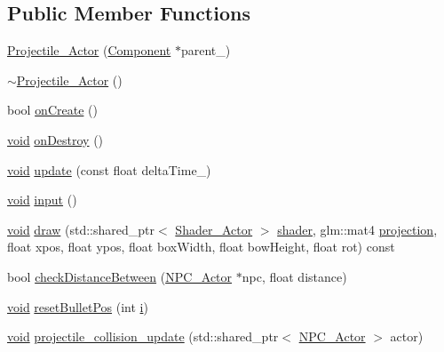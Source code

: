 \subsection*{Public Member Functions}
\begin{DoxyCompactItemize}
\item 
\hyperlink{classProjectile__Actor_a2cae6df0c47bae8d6162855c310be1df}{Projectile\+\_\+\+Actor} (\hyperlink{classComponent}{Component} $\ast$parent\+\_\+)
\item 
\hyperlink{classProjectile__Actor_a0813f8233d0b8df5e9ac8cf47b12b5a8}{$\sim$\+Projectile\+\_\+\+Actor} ()
\item 
bool \hyperlink{classProjectile__Actor_a98e2e2198cd164c35318c04f96e6a3ac}{on\+Create} ()
\item 
\hyperlink{imgui__impl__opengl3__loader_8h_ac668e7cffd9e2e9cfee428b9b2f34fa7}{void} \hyperlink{classProjectile__Actor_a58d01ff77f0815ca611236f139b7aafa}{on\+Destroy} ()
\item 
\hyperlink{imgui__impl__opengl3__loader_8h_ac668e7cffd9e2e9cfee428b9b2f34fa7}{void} \hyperlink{classProjectile__Actor_ab61aec7117a93626c3096bef71ab30fc}{update} (const float delta\+Time\+\_\+)
\item 
\hyperlink{imgui__impl__opengl3__loader_8h_ac668e7cffd9e2e9cfee428b9b2f34fa7}{void} \hyperlink{classProjectile__Actor_a63aab28b99512041ebbd7474c8acb1b4}{input} ()
\item 
\hyperlink{imgui__impl__opengl3__loader_8h_ac668e7cffd9e2e9cfee428b9b2f34fa7}{void} \hyperlink{classProjectile__Actor_ab2cbe2e37cc22542c5a4446e33075300}{draw} (std\+::shared\+\_\+ptr$<$ \hyperlink{classShader__Actor}{Shader\+\_\+\+Actor} $>$ \hyperlink{imgui__impl__opengl3__loader_8h_a57b2a96adb1d51204909a82d861e395e}{shader}, glm\+::mat4 \hyperlink{main__menu__state_8cpp_a565d92bfbcc4a481d2d35f3850a382f7}{projection}, float xpos, float ypos, float box\+Width, float bow\+Height, float rot) const
\item 
bool \hyperlink{classProjectile__Actor_ae13d6d387d1effcdf9a2803ed5c35d1c}{check\+Distance\+Between} (\hyperlink{classNPC__Actor}{N\+P\+C\+\_\+\+Actor} $\ast$npc, float distance)
\item 
\hyperlink{imgui__impl__opengl3__loader_8h_ac668e7cffd9e2e9cfee428b9b2f34fa7}{void} \hyperlink{classProjectile__Actor_af9d53296ef36ff9c63acaaea996366ce}{reset\+Bullet\+Pos} (int \hyperlink{game__play__state_8cpp_acb559820d9ca11295b4500f179ef6392}{i})
\item 
\hyperlink{imgui__impl__opengl3__loader_8h_ac668e7cffd9e2e9cfee428b9b2f34fa7}{void} \hyperlink{classProjectile__Actor_aa81c08d48039d932378d9579628e91e9}{projectile\+\_\+collision\+\_\+update} (std\+::shared\+\_\+ptr$<$ \hyperlink{classNPC__Actor}{N\+P\+C\+\_\+\+Actor} $>$ actor)

\end{DoxyCompactItemize}
